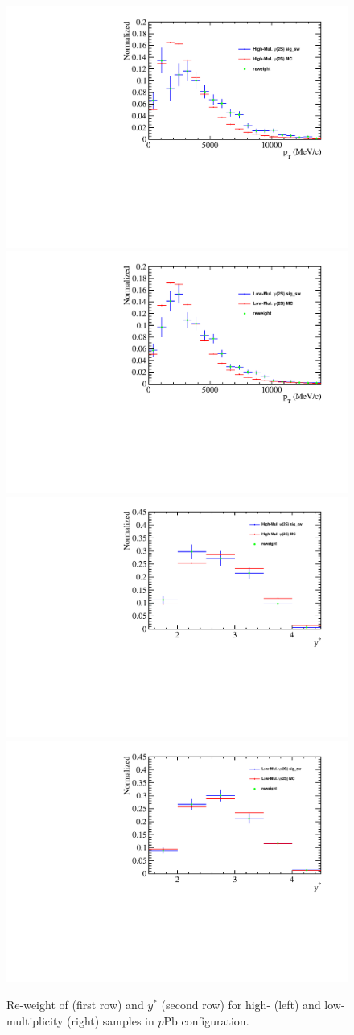 \begin{figure}[H]
\begin{center}
\includegraphics[width=0.37\linewidth]{pdf/pPb/Workdir/Reweight/Psi2SHighMulPT.pdf}
\includegraphics[width=0.37\linewidth]{pdf/pPb/Workdir/Reweight/Psi2SLowMulPT.pdf}
\includegraphics[width=0.37\linewidth]{pdf/pPb/Workdir/Reweight/Psi2SHighMulY.pdf}
\includegraphics[width=0.37\linewidth]{pdf/pPb/Workdir/Reweight/Psi2SLowMulY.pdf}
\end{center}
\caption{
	Re-weight of \pt (first row) and $y^*$ (second row) for high- (left) and low-multiplicity (right) \psitwos samples in $p$Pb configuration.}
\label{PTYReweightP}
\end{figure}

